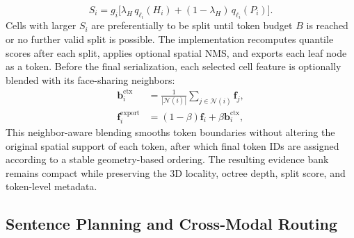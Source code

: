 \begin{equation}
S_i
=
g_i\Big[
\lambda_H\, q_{\ell_i}(H_i)
+
(1-\lambda_H)\, q_{\ell_i}(P_i)
\Big].
\label{eq:importance_new_v2}
\end{equation}
Cells with larger $S_i$ are preferentially to be split until token budget $B$ is reached or no further valid split is possible. The implementation recomputes quantile scores after each split, applies optional spatial NMS, and exports each leaf node as a token. Before the final serialization, each selected cell feature is optionally blended with its face-sharing neighbors:
\begin{align}
\mathbf{b}_i^{\mathrm{ctx}} &= \frac{1}{|\mathcal{N}(i)|}\sum_{j\in\mathcal{N}(i)} \mathbf{f}_j,
\label{eq:neighbor_new}\\
\mathbf{f}_i^{\mathrm{export}} &= (1-\beta)\mathbf{f}_i + \beta \mathbf{b}_i^{\mathrm{ctx}},
\label{eq:blend_new}
\end{align}
This neighbor-aware blending smooths token boundaries without altering the original spatial support of each token, after which final token IDs are assigned according to a stable geometry-based ordering. The resulting evidence bank remains compact while preserving the 3D locality, octree depth, split score, and token-level metadata.


\subsection{Sentence Planning and Cross-Modal Routing}
\label{sec:routing}

